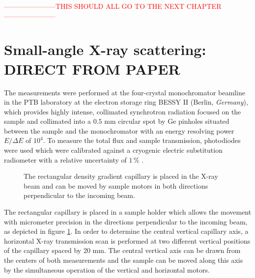 \textcolor{red}{-----------------------THIS SHOULD ALL GO TO THE NEXT CHAPTER-----------------------}











\section{Small-angle X-ray scattering: DIRECT FROM PAPER}
The measurements were performed at the four-crystal monochromator beamline in the PTB laboratory at the electron storage ring BESSY II (Berlin, \emph{Germany}), which provides highly intense, collimated synchrotron radiation focused on the sample and collimated into a \(0.5\) mm circular spot by Ge pinholes situated between the sample and the monochromator with an energy resolving power \( E/\Delta E \) of \( 10^4 \). To measure the total flux and sample transmission, photodiodes were used which were calibrated against a cryogenic electric substitution radiometer with a relative uncertainty of \( 1\,\% \) \cite{krumrey_high-accuracy_2001}.


\begin{figure}%
	\centering
		
		\caption{The rectangular density gradient capillary is placed in the X-ray beam and can be moved by sample motors in both directions perpendicular to the incoming beam.}
		\label{fig:DensityGradientCapillarySetup}
\end{figure}

The rectangular capillary is placed in a sample holder which allows the movement with micrometer precision in the directions perpendicular to the incoming beam, as depicted in figure \ref{fig:DensityGradientCapillarySetup}. In order to determine the central vertical capillary axis, a horizontal X-ray transmission scan is performed at two different vertical positions of the capillary spaced by 20 mm. The central vertical axis can be drawn from the centers of both measurements and the sample can be moved along this axis by the simultaneous operation of the vertical and horizontal motors.

